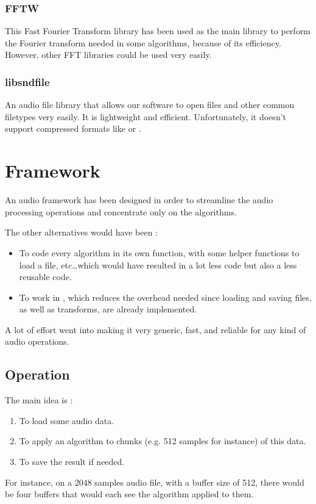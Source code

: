\subsubsection{FFTW}
This Fast Fourier Transform library has been used as the main library to perform the Fourier transform needed in some algorithms, because of its efficiency. However, other FFT libraries could be used very easily.
\subsubsection{libsndfile}
An audio file library that allows our software to open  files and other common filetypes very easily. It is lightweight and efficient. Unfortunately, it doesn't support compressed formats like  or . 

\section{Framework}
An audio framework has been designed in order to streamline the audio processing operations and concentrate only on the algorithms.

The other alternatives would have been :
\begin{itemize}
\item To code every algorithm in its own function, with some helper functions to load a file, etc\dots which would have resulted in a lot less code but also a less reusable code.
\item To work in , which reduces the overhead needed since loading and saving files, as well as transforms, are already implemented.
\end{itemize}

A lot of effort went into making it very generic, fast, and reliable for any kind of audio operations.


\subsection{Operation}
The main idea is : 
\begin{enumerate}
\item To load some audio data.
\item To apply an algorithm to chunks (e.g. 512 samples for instance) of this data.
\item To save the result if needed.
\end{enumerate}

For instance, on a 2048 samples audio file, with a buffer size of 512, there would be four buffers that would each see the algorithm applied to them.

